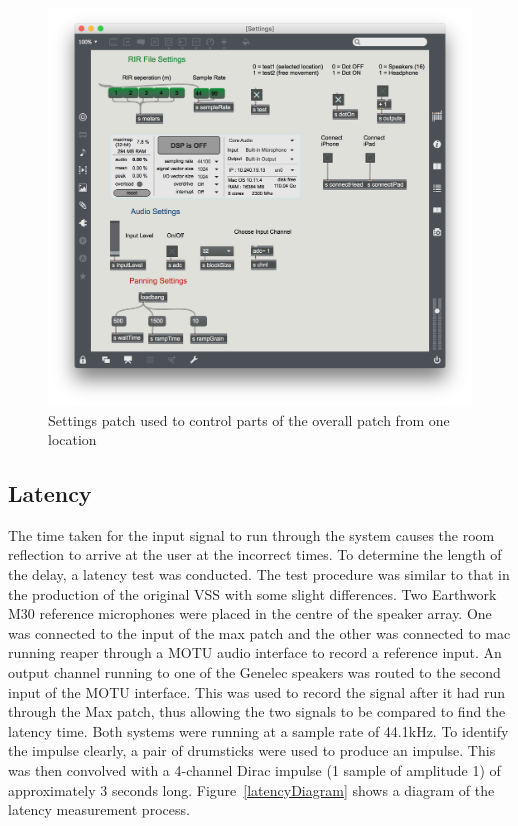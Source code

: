 \documentclass[../../main.tex]{subfiles}
\begin{document}
		\begin{figure}[H]
			\centerline{\includegraphics[scale = 0.4]{Sections/Implementation/Max/images/settings.png}}
			\caption{Settings patch used to control parts of the overall patch from one location}
			\label{settings}
		\end{figure}


	\subsection{Latency}

		The time taken for the input signal to run through the system causes the room reflection to arrive at the user at the incorrect times. To determine the length of the delay, a latency test was conducted. The test procedure was similar to that in the production of the original \ac{VSS} \cite{Brereton2014} with some slight differences. Two Earthwork M30 reference microphones \cite{earthworks} were placed in the centre of the speaker array. One was connected to the input of the max patch and the other was connected to mac running reaper through a MOTU audio interface \cite{motu} to record a reference input. An output channel running to one of the Genelec speakers was routed to the second input of the MOTU interface. This was used to record the signal after it had run through the Max patch, thus allowing the two signals to be compared to find the latency time. Both systems were running at a sample rate of 44.1kHz. To identify the impulse clearly, a pair of drumsticks were used to produce an impulse. This was then convolved with a 4-channel Dirac impulse (1 sample of amplitude 1) of approximately 3 seconds long. Figure~\ref{latencyDiagram} shows a diagram of the latency measurement process.
\end{document}
